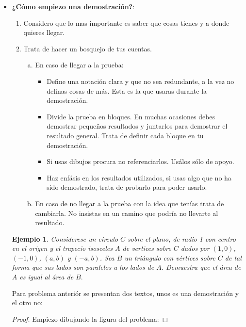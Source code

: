 \documentclass[10pt]{article}
\newtheorem{ejm}{Ejemplo}
\begin{document}
\begin{itemize}
\item \textbf{¿Cómo empiezo una demostración?}:  
\begin{enumerate}
\item Considero que lo mas importante es saber que cosas tienes y a donde quieres llegar. 
\item Trata de hacer un bosquejo de tus cuentas.

\begin{enumerate}[a)]
\item En caso de llegar a la prueba:

\begin{itemize}
\item  Define una notación clara y que no sea redundante, a la vez no definas cosas de más. Esta es la que usaras durante la demostración.   

\item Divide la prueba en bloques. En muchas ocasiones debes demostrar pequeños resultados y juntarlos para demostrar el resultado general. Trata de definir cada bloque en tu demostración.

\item Si usas dibujos procura no referenciarlos. Usálos sólo de apoyo.  

\item Haz enfásis en los resultados utilizados, si usas algo que no ha sido demostrado, trata de probarlo para poder usarlo.
\end{itemize}

\item En caso de no llegar a la prueba con la idea que tenías trata de cambiarla. No insistas en un camino que podría no llevarte al resultado.
\end{enumerate}

\end{enumerate}
\begin{ejm}
Considerese un círculo $C$ sobre el plano, de radio 1 con centro en el origen y el trapecio isosceles $A$ de vertices sobre $C$ dados por $(1,0)$, $(-1,0)$, $(a,b)$ y $(-a,b)$. Sea $B$ un triángulo con vértices sobre $C$ de tal forma que sus lados son paralelos a los lados de $A$. Demuestra que el área de $A$ es igual al área de $B.$

\end{ejm}
Para problema anteriór se presentan dos textos, unos es una demostración y el otro no:

\begin{proof}
Empiezo dibujando la figura del problema:



\end{proof}
\end{itemize}
\end{document}
